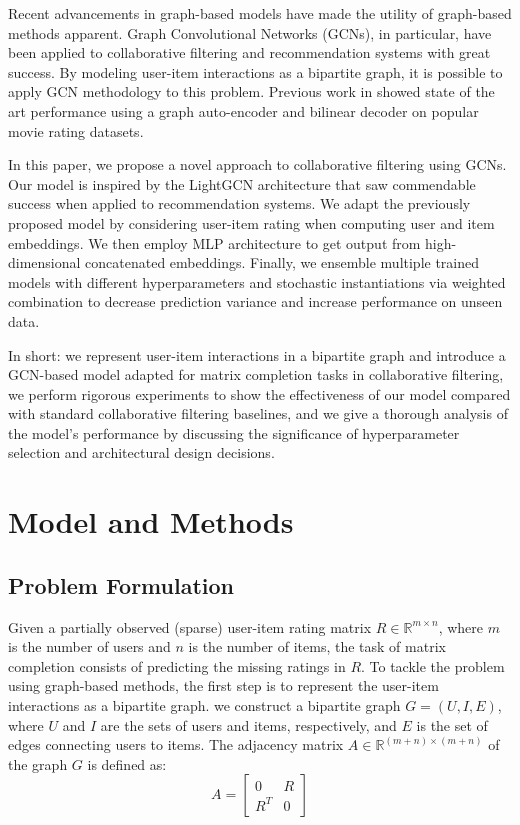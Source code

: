 \documentclass[10pt,conference,compsocconf]{IEEEtran}
\begin{document}
Recent advancements in graph-based models have made the utility of graph-based methods apparent. Graph Convolutional Networks (GCNs), in particular, have been applied to collaborative filtering and recommendation systems with great success. By modeling user-item interactions as a bipartite graph, it is possible to apply GCN methodology to this problem. Previous work in \cite{van2017graph} showed state of the art performance using a graph auto-encoder and bilinear decoder on popular movie rating datasets.

In this paper, we propose a novel approach to collaborative filtering using GCNs. Our model is inspired by the LightGCN \cite{he2020lightgcn} architecture that saw commendable success when applied to recommendation systems. We adapt the previously proposed model by considering user-item rating when computing user and item embeddings. We then employ MLP architecture to get output from high-dimensional concatenated embeddings. Finally, we ensemble multiple trained models with different hyperparameters and stochastic instantiations via weighted combination to decrease prediction variance and increase performance on unseen data.

In short: we represent user-item interactions in a bipartite graph and introduce a GCN-based model adapted for matrix completion tasks in collaborative filtering, we perform rigorous experiments to show the effectiveness of our model compared with standard collaborative filtering baselines, and we give a thorough analysis of the model's performance by discussing the significance of hyperparameter selection and architectural design decisions.

\section{Model and Methods}
\subsection{Problem Formulation}
Given a partially observed (sparse) user-item rating matrix $R \in \mathbb{R}^{m \times n}$, where $m$ is the number of users and $n$ is the number of items, the task of matrix completion consists of predicting the missing ratings in $R$.
To tackle the problem using graph-based methods, the first step is to represent the user-item interactions as a bipartite graph.
 we construct a bipartite graph $G = (U, I, E)$, where $U$ and $I$ are the sets of users and items, respectively, and $E$ is the set of edges connecting users to items.
The adjacency matrix $A \in \mathbb{R}^{(m+n) \times (m+n)}$ of the graph $G$ is defined as:
\begin{equation}
    A = \begin{bmatrix}
    0 & R \\
    R^T & 0
    \end{bmatrix}
\end{equation}
\end{document}
